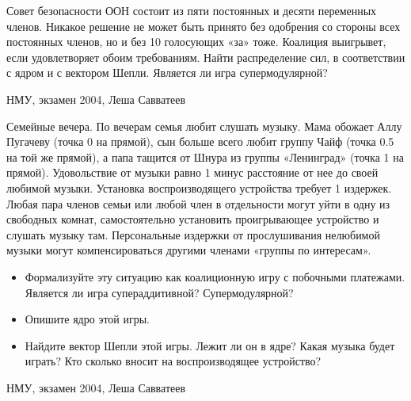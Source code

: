 \begin{problem}

Совет безопасности ООН состоит из пяти постоянных и десяти переменных членов. Никакое решение не может быть принято без одобрения со стороны всех постоянных членов, но и без 10 голосующих «за» тоже. Коалиция выигрывет, если удовлетворяет обоим требованиям. Найти распределение сил, в соответствии с ядром и с вектором Шепли. Является ли игра супермодулярной?




\begin{source}
НМУ, экзамен 2004, Леша Савватеев
\end{source}


\begin{sol}

\end{sol}
\end{problem}



\begin{problem}

Семейные вечера. По вечерам семья любит слушать музыку. Мама обожает Аллу Пугачеву (точка 0 на прямой), сын больше всего любит группу Чайф (точка 0.5 на той же прямой), а папа тащится от Шнура из группы «Ленинград» (точка 1 на прямой). Удовольствие от музыки равно 1 минус расстояние от нее до своей любимой музыки.
Установка воспроизводящего устройства требует 1 издержек. Любая пара членов семьи или любой член в отдельности могут уйти в одну из свободных комнат, самостоятельно установить проигрывающее устройство и слушать музыку там. Персональные издержки от прослушивания нелюбимой музыки могут компенсироваться другими членами «группы по интересам».
\begin{itemize}
\item Формализуйте эту ситуацию как коалиционную игру с побочными платежами. Является ли игра супераддитивной? Супермодулярной?
\item Опишите ядро этой игры.
\item Найдите вектор Шепли этой игры. Лежит ли он в ядре? Какая музыка будет играть? Кто сколько вносит на воспроизводящее устройство?
\end{itemize}




\begin{source}
НМУ, экзамен 2004, Леша Савватеев
\end{source}


\begin{sol}

\end{sol}
\end{problem}




